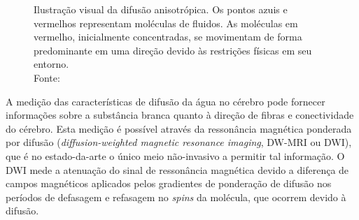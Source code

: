 \documentclass[
    12pt,                %
    oneside,            %
    a4paper,            %
    english,            %
    french,                %
    spanish,            %
    brazil                %
    ]{abntex2}
\begin{document}
\begin{figure}[ht]
\centering
\captionsetup[subfloat]{farskip=0pt,nearskip=0pt}
    \caption{Ilustração visual da difusão anisotrópica. Os pontos azuis e vermelhos representam moléculas de fluidos. As moléculas em vermelho, inicialmente concentradas, se movimentam de forma predominante em uma direção devido às restrições físicas em seu entorno. \\ Fonte: \cite{voltoline2016}
    }
    \label{fig::intro_difusao_anisotropica}
\end{figure}



A medição das características de difusão da água no cérebro pode fornecer informações sobre a substância branca quanto à direção de fibras e conectividade do cérebro. Esta medição é possível através da ressonância magnética ponderada por difusão (\textit{diffusion-weighted magnetic resonance imaging}, DW-MRI ou DWI), que é no estado-da-arte o único meio não-invasivo a permitir tal informação. O DWI mede a atenuação do sinal de ressonância magnética devido a diferença de campos magnéticos aplicados pelos gradientes de ponderação de difusão nos períodos de defasagem e refasagem no \textit{spins} da molécula, que ocorrem devido à difusão.
\end{document}
